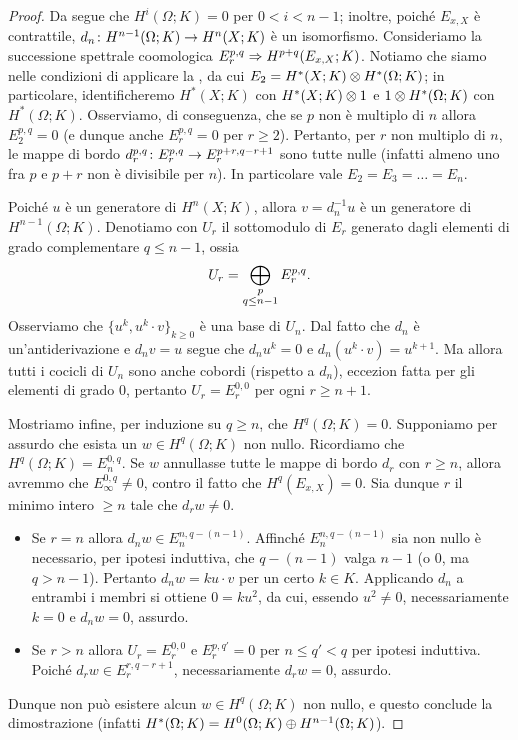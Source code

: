 \begin{proof}
Da \missing{} segue che $H^i(\Omega;K)=0$ per $0<i<n-1$; inoltre, poiché $E_{x,X}$ è contrattile, $d_n\colon H^{n-1}(\Omega;K)\to H^n(X;K)$ è un isomorfismo.  Consideriamo la successione spettrale coomologica $E^{p,q}_r\Rightarrow H^{p+q}(E_{x,X};K)$. Notiamo che siamo nelle condizioni di applicare la , da cui $E_2=H^*(X;K)\mathbin{\otimes} H^*(\Omega;K)$; in particolare, identificheremo $H^*(X;K)$ con $H^*(X;K)\mathbin{\otimes} 1$ e $1\mathbin{\otimes} H^*(\Omega;K)$ con $H^*(\Omega;K)$. Osserviamo, di conseguenza, che se $p$ non è multiplo di $n$ allora $E^{p,q}_2=0$ (e dunque anche $E^{p,q}_r=0$ per $r\ge2$). Pertanto, per $r$ non multiplo di $n$, le mappe di bordo $d^{p,q}_r\colon E^{p,q}_r\to E^{p+r,q-r+1}_r$ sono tutte nulle (infatti almeno uno fra $p$ e $p+r$ non è divisibile per $n$). In particolare vale $E_2=E_3=\ldots=E_n$.

Poiché $u$ è un generatore di $H^n(X;K)$, allora $v=d_n^{-1}u$ è un generatore di $H^{n-1}(\Omega;K)$. Denotiamo con $U_r$ il sottomodulo di $E_r$ generato dagli elementi di grado complementare $q\le n-1$, ossia
$$
U_r=\bigoplus_{\substack{p\\q\le n-1}}E^{p,q}_r.
$$
Osserviamo che $\{u^k,u^k\cdot v\}_{k\ge 0}$ è una base di $U_n$. Dal fatto che $d_n$ è un'antiderivazione e $d_nv=u$ segue che $d_n u^k=0$ e $d_n(u^k\cdot v)=u^{k+1}$. Ma allora tutti i cocicli di $U_n$ sono anche cobordi (rispetto a $d_n$), eccezion fatta per gli elementi di grado $0$, pertanto $U_r=E^{0,0}_r$ per ogni $r\ge n+1$.

Mostriamo infine, per induzione su $q\ge n$, che $H^q(\Omega;K)=0$. Supponiamo per assurdo che esista un $w\in H^q(\Omega;K)$ non nullo. Ricordiamo che $H^q(\Omega;K)=E^{0,q}_n$. Se $w$ annullasse tutte le mappe di bordo $d_r$ con $r\ge n$, allora avremmo che $E^{0,q}_\infty\neq 0$, contro il fatto che $H^q(E_{x,X})=0$. Sia dunque $r$ il minimo intero $\ge n$ tale che $d_rw\neq 0$.
\begin{itemize}
\item Se $r=n$ allora $d_nw\in E^{n,q-(n-1)}_n$. Affinché $E^{n,q-(n-1)}_n$ sia non nullo è necessario, per ipotesi induttiva, che $q-(n-1)$ valga $n-1$ (o $0$, ma $q>n-1$). Pertanto $d_nw=ku\cdot v$ per un certo $k\in K$. Applicando $d_n$ a entrambi i membri si ottiene $0=ku^2$, da cui, essendo $u^2\neq 0$, necessariamente $k=0$ e $d_nw=0$, assurdo.
\item Se $r>n$ allora $U_r=E^{0,0}_r$ e $E^{p,q'}_r=0$ per $n\le q'<q$ per ipotesi induttiva. Poiché $d_rw\in E^{r,q-r+1}_r$, necessariamente $d_rw=0$, assurdo.
\end{itemize}
Dunque non può esistere alcun $w\in H^q(\Omega;K)$ non nullo, e questo conclude la dimostrazione (infatti $H^*(\Omega;K)=H^0(\Omega;K)\mathbin{\oplus} H^{n-1}(\Omega;K)$).
\end{proof}
